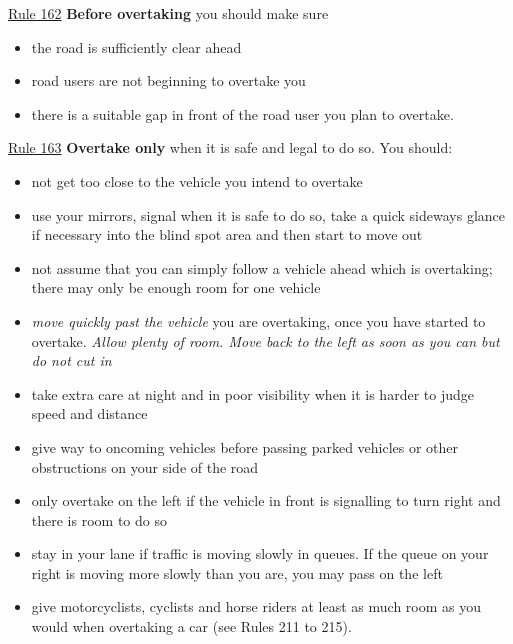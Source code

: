 \vspace{2mm}
\noindent\underline{Rule 162}    
    \textbf{Before overtaking} you should make sure
    \begin{itemize}
        \item the road is sufficiently clear ahead
        \item road users are not beginning to overtake you
        \item there is a suitable gap in front of the road user you plan to overtake.
    \end{itemize}
	
    
\noindent\underline{Rule 163}
    \textbf{Overtake only} when it is safe and legal to do so. You should:
    \begin{itemize}
        \item not get too close to the vehicle you intend to overtake
        \item use your mirrors, signal when it is safe to do so, take a quick sideways glance if necessary into the blind spot area and then start to move out
        \item not assume that you can simply follow a vehicle ahead which is overtaking; there may only be enough room for one vehicle
        \item \emph{move quickly past the vehicle} you are overtaking, once you have started to overtake. \emph{Allow plenty of room. Move back to the left as soon as you can but do not cut in}
        \item take extra care at night and in poor visibility when it is harder to judge speed and distance
        \item give way to oncoming vehicles before passing parked vehicles or other obstructions on your side of the road
        \item only overtake on the left if the vehicle in front is signalling to turn right and there is room to do so
        \item stay in your lane if traffic is moving slowly in queues. If the queue on your right is moving more slowly than you are, you may pass on the left
        \item give motorcyclists, cyclists and horse riders at least as much room as you would when overtaking a car (see Rules 211 to 215).
    \end{itemize}



